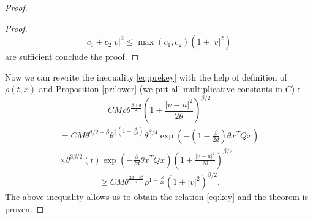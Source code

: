 \begin{proof}
\begin{proof}
\[c_1+c_2|v|^2\le \max (c_1,c_2)(1+|v|^2)\]
are sufficient conclude the proof.
\end{proof}
Now we can rewrite the inequality \eqref{eq:prekey} with the help of definition of $\rho(t,x)$ and Proposition \ref{pr:lower} (we put all multiplicative constants in $C$) :
\[CM \rho \theta^{\frac{\beta+d}{2}}\left(1+\frac{|v-u|^2}{2 \theta}\right)^{\beta/2}\]\[\begin{split}
	=CM \theta^{d/2- \beta} \theta^{\frac{d}{2}\left(1-\frac{\beta}{2d}\right)} \theta^{\beta/4}\exp\left(-\left(1-\frac{\beta}{2d}\right)\theta x^TQx\right)\\\times\theta^{3 \beta/2} (t)\exp\left(-\frac{\beta}{2d}\theta x^TQx\right) \left(1+\frac{|v-u|^2}{2 \theta}\right)^{\beta/2}
\end{split}\]
\[\ge C M \theta^{\frac{2d-3 \beta}{4}}\rho^{1-\frac{\beta}{2d}}(1+|v|^2)^{\beta/2}.\]
The above inequality allows us to obtain the relation \eqref{eq:key} and the theorem is proven.
\end{proof}



